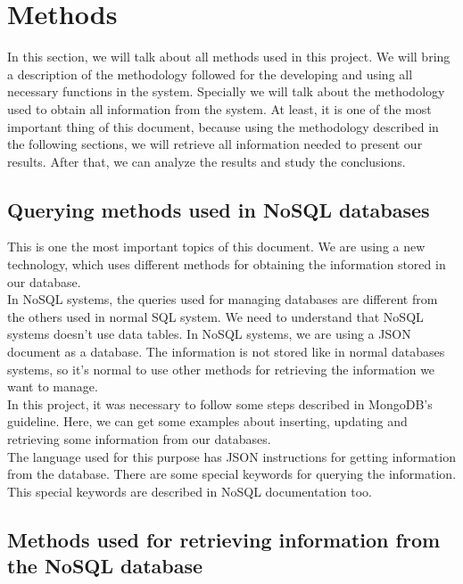 \section{Methods}

In this section, we will talk about all methods used in this project. We will bring a description of the methodology followed for the developing and using all necessary functions in the system. Specially we will talk about the methodology used to obtain all information from the system. At least, it is one of the most important thing of this document, because using the methodology described in the following sections, we will retrieve all information needed to present our results. After that, we can analyze the results and study the conclusions.

\subsection{Querying methods used in NoSQL databases}

This is one the most important topics of this document. We are using a new technology, which uses different methods for obtaining the information stored in our database.\\

In NoSQL systems, the queries used for managing databases are different from the others used in normal SQL system. We need to understand that NoSQL systems doesn't use data tables. In NoSQL systems, we are using a JSON document as a database. The information is not stored like in normal databases systems, so it's normal to use other methods for retrieving the information we want to manage.\\

In this project, it was necessary to follow some steps described in MongoDB's guideline. Here, we can get some examples about inserting, updating and retrieving some information from our databases.\\

The language used for this purpose has JSON instructions for getting information from the database. There are some special keywords for querying the information. This special keywords are described in NoSQL documentation too.

\subsection{Methods used for retrieving information from the NoSQL database}

